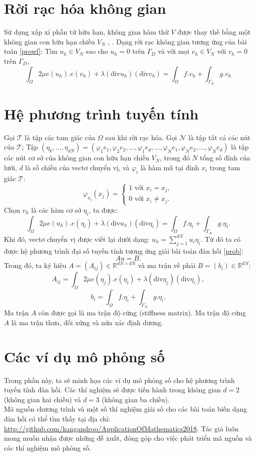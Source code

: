 \documentclass[
12pt, %
oneside, %
english, %
onehalfspacing, %
nolistspacing, %
headsepline, %
addchap,
]{MastersDoctoralThesis} %
\begin{document}
\section{Rời rạc hóa không gian}\label{sec:chap1_spatialDiscrete}
Sử dụng xấp xỉ phần tử hữu hạn, không gian hàm thử $V$ được thay thế bằng một không gian con hữu hạn chiều $V_N$ \citep{XILT08}, \citep{Bor90}. Dạng rời rạc không gian tương ứng của bài toán \ref{prowf}: Tìm $u_h \in V_N$
sao cho $u_h = 0$ trên $\Gamma_D$ và với mọi $v_h \in V_N$ với $v_h = 0$ trên $\Gamma_D$,
\begin{equation}\label{prod}
\int_\Omega 2\mu e(u_h) . e(v_h) + \lambda(\text{div}u_h)(\text{div}v_h) = \int_\Omega f.v_h + \int_{\Gamma_N}g.v_h
\end{equation}
\section{Hệ phương trình tuyến tính}\label{sec:chap1_linearSystem}
Gọi $\mathcal{T}$ là tập các tam giác của $\Omega$ sau khi rời rạc hóa. Gọi $\mathcal{N}$ là tập tất cả các nút của $\mathcal{T}$; Tập $(\eta_k,...,\eta_{dN})=(\varphi_1e_1, \varphi_2e_2,...,\varphi_1e_d,...,\varphi_Ne_1,\varphi_Ne_2,...,\varphi_Ne_d)$ là tập các nút cơ sở của không gian con hữu hạn chiều $V_N$, trong đó $N$ tổng số đỉnh của lưới, $d$ là số chiều của vectơ chuyển vị, và $\varphi_i$ là hàm mũ tại đỉnh $x_i$ trong tam giác $\mathcal{T}$:
$$\varphi_{x_i}(x_j) = \begin{cases}
1 \text{ với } x_i = x_j, \\
0 \text{ với } x_i \neq x_j.
\end{cases}$$
Chọn $v_h$ là các hàm cơ sở $\eta_i$, ta được:
$$\int_\Omega 2\mu e(u_h) . e(\eta_i) + \lambda(\text{div}u_h)(\text{div}\eta_i) = \int_\Omega f.\eta_i + \int_{\Gamma_N}g.\eta_i.$$
Khi đó, vectơ chuyển vị được viết lại dưới dạng: $u_h = \sum_{j=1}^{dN}u_i\eta_i$. Từ đó ta có được hệ phương trình đại số tuyến tính tương ứng giải bài toán đàn hồi \eqref{prob}:
\begin{equation}\label{pron}
Au=B.
\end{equation}
Trong đó, ta ký hiệu $A=(A_{ij})\in\mathbb{R}^{dN \times dN}$ và ma trận vế phải $B=(b_i)\in\mathbb{R}^{dN}$:
$$A_{ij}=\displaystyle\int_\Omega 2\mu e(\eta_j) . e(\eta_i) + \lambda(\text{div}\eta_j)(\text{div}\eta_i),$$
$$b_i=\int_\Omega f.\eta_i + \int_{\Gamma_N}g.\eta_i.$$
Ma trận $A$ còn được gọi là ma trận độ cứng (stiffness matrix). Ma trận độ cứng $A$ là ma trận thưa, đối xứng và nửa xác định dương.
\section{Các ví dụ mô phỏng số}
Trong phần này, ta sẽ minh họa các ví dụ mô phỏng số cho hệ phương trình tuyến tính đàn hồi. Các thí nghiệm sẽ được tiến hành trong không gian $d=2$ (không gian hai chiều) và $d=3$ (không gian ba chiều).\\
Mã nguồn chương trình và một số thí nghiệm giải số cho các bài toán biến dạng đàn hồi có thể tìm thấy tại địa chỉ:\\
\url{http://github.com/kangandroo/ApplicationOfMathematics2018}. Tác giả luôn mong muốn nhận được những đề xuất, đóng góp cho việc phát triển mã nguồn và các thí nghiệm mô phỏng số.
\end{document}
